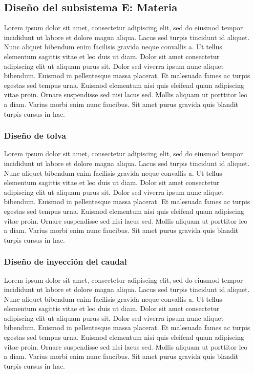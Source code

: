 \subsection{Diseño del subsistema E: Materia}

Lorem ipsum dolor sit amet, consectetur adipiscing elit, sed do eiusmod tempor incididunt ut labore et dolore magna aliqua. Lacus sed turpis tincidunt id aliquet. Nunc aliquet bibendum enim facilisis gravida neque convallis a. Ut tellus elementum sagittis vitae et leo duis ut diam. Dolor sit amet consectetur adipiscing elit ut aliquam purus sit. Dolor sed viverra ipsum nunc aliquet bibendum. Euismod in pellentesque massa placerat. Et malesuada fames ac turpis egestas sed tempus urna. Euismod elementum nisi quis eleifend quam adipiscing vitae proin. Ornare suspendisse sed nisi lacus sed. Mollis aliquam ut porttitor leo a diam. Varius morbi enim nunc faucibus. Sit amet purus gravida quis blandit turpis cursus in hac.

\subsubsection{Diseño de tolva} %

Lorem ipsum dolor sit amet, consectetur adipiscing elit, sed do eiusmod tempor incididunt ut labore et dolore magna aliqua. Lacus sed turpis tincidunt id aliquet. Nunc aliquet bibendum enim facilisis gravida neque convallis a. Ut tellus elementum sagittis vitae et leo duis ut diam. Dolor sit amet consectetur adipiscing elit ut aliquam purus sit. Dolor sed viverra ipsum nunc aliquet bibendum. Euismod in pellentesque massa placerat. Et malesuada fames ac turpis egestas sed tempus urna. Euismod elementum nisi quis eleifend quam adipiscing vitae proin. Ornare suspendisse sed nisi lacus sed. Mollis aliquam ut porttitor leo a diam. Varius morbi enim nunc faucibus. Sit amet purus gravida quis blandit turpis cursus in hac.

\subsubsection{Diseño de inyección del caudal} %

Lorem ipsum dolor sit amet, consectetur adipiscing elit, sed do eiusmod tempor incididunt ut labore et dolore magna aliqua. Lacus sed turpis tincidunt id aliquet. Nunc aliquet bibendum enim facilisis gravida neque convallis a. Ut tellus elementum sagittis vitae et leo duis ut diam. Dolor sit amet consectetur adipiscing elit ut aliquam purus sit. Dolor sed viverra ipsum nunc aliquet bibendum. Euismod in pellentesque massa placerat. Et malesuada fames ac turpis egestas sed tempus urna. Euismod elementum nisi quis eleifend quam adipiscing vitae proin. Ornare suspendisse sed nisi lacus sed. Mollis aliquam ut porttitor leo a diam. Varius morbi enim nunc faucibus. Sit amet purus gravida quis blandit turpis cursus in hac.

